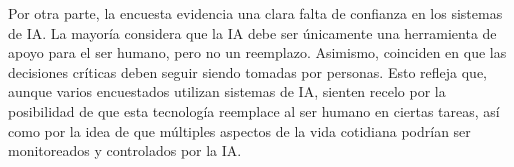 \documentclass[12pt,a4paper]{article}
\begin{document}
Por otra parte, la encuesta evidencia una clara falta de confianza en los sistemas de IA. 
La mayoría considera que la IA debe ser únicamente una herramienta de apoyo para el ser humano, 
pero no un reemplazo. Asimismo, coinciden en que las decisiones críticas deben seguir siendo tomadas por personas. 
Esto refleja que, aunque varios encuestados utilizan sistemas de IA, sienten recelo por la posibilidad de que esta tecnología reemplace al ser humano 
en ciertas tareas, así como por la idea de que múltiples aspectos de la vida cotidiana podrían ser monitoreados y controlados por la IA.
\end{document}

